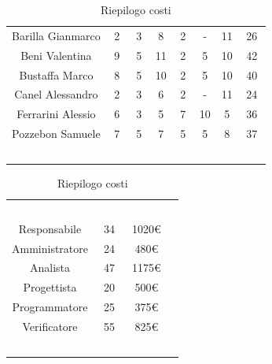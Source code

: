 \begin{table}[htb]
\begin{minipage}[c]{0.53\textwidth}
\begin{tabular}{>{\raggedright\arraybackslash}c|cccccc|c}
		\rowcolor[RGB]{216, 235, 171}
	    	Barilla Gianmarco & 2 & 3 & 8 & 2 & - & 11& 26		\\[4pt]
	    \rowcolor[RGB]{233, 245, 206}
	    	Beni Valentina & 9 & 5 & 11 & 2 & 5 & 10& 42			\\[4pt]
	    \rowcolor[RGB]{216, 235, 171}
	    	Bustaffa Marco & 8 & 5 & 10 & 2 & 5 & 10& 40			\\[4pt]
        \rowcolor[RGB]{233, 245, 206}
	    	Canel Alessandro & 2 & 3 & 6 & 2 & - & 11& 24 			\\[4pt]
        \rowcolor[RGB]{216, 235, 171}
	    	Ferrarini Alessio & 6 & 3 & 5 & 7 & 10 & 5& 36		\\[4pt]
        \rowcolor[RGB]{233, 245, 206}
	    	Pozzebon Samuele & 7 & 5 & 7 & 5 & 5 & 8& 37			\\[4pt]
		\rowcolor[RGB]{47, 106, 73}
			\textcolor{white}{Totale Ruolo} & \textcolor{white}{34} & \textcolor{white}{24} & \textcolor{white}{47} 
			& \textcolor{white}{20} & \textcolor{white}{25} & \textcolor{white}{55}
			& \textcolor{white}{205} \\[4pt]	
    \end{tabular}
    \caption{Riepilogo distribuzione oraria}
\end{minipage}
\hfill
\begin{minipage}{0.33\textwidth}
	\centering
	\begin{tabular}{cccc}
	    \rowcolor[RGB]{33, 73, 50}
	    \textcolor{white}{\textbf{Ruolo}} & \textcolor{white}{\textbf{Ore}} & \textcolor{white}{\textbf{Costo}}\\[4pt]
	    \rowcolor[RGB]{216, 235, 171}
	    Responsabile & 34 & 1020\euro\\[4pt]
	    \rowcolor[RGB]{233, 245, 206}
	    Amministratore & 24 & 480\euro\\[4pt]
        \rowcolor[RGB]{216, 235, 171}
	    Analista & 47 & 1175\euro\\[4pt]
	    \rowcolor[RGB]{233, 245, 206}
	    Progettista & 20 & 500\euro\\[4pt]
        \rowcolor[RGB]{216, 235, 171}
	    Programmatore & 25 & 375\euro\\[4pt]
	    \rowcolor[RGB]{233, 245, 206}
	    Verificatore & 55 & 825\euro\\[4pt]
		\rowcolor[RGB]{47, 106, 73}
			\textcolor{white}{Totale} & \textcolor{white}{205} & \textcolor{white}{4375\euro}\\[4pt]	
    \end{tabular}	
	\caption{Riepilogo costi}

\end{minipage}
\end{table}


